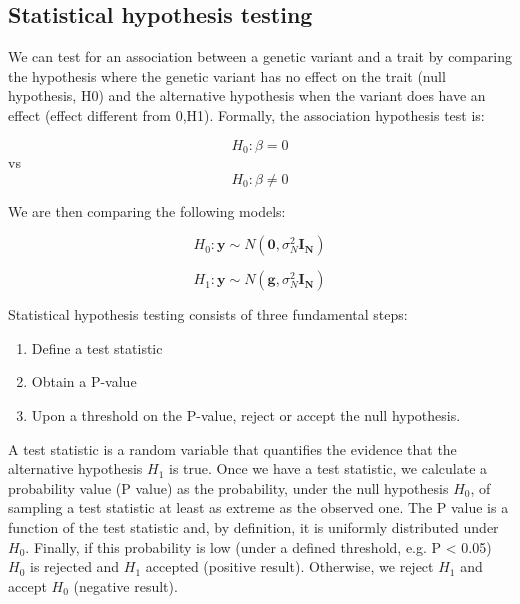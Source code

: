 
\newpage

\subsection{Statistical hypothesis testing}

We can test for an association between a genetic variant and a trait by comparing the hypothesis where the genetic variant has no effect on the trait (null hypothesis, H0) and the alternative hypothesis when the variant does have an effect (effect different from 0,H1).
Formally, the association hypothesis test is:

\begin{equation}\label{eq14:null_hypothesis}
 H_{0}: \beta=0 
\end{equation}
vs
\begin{equation}\label{eq15:alternative_hypothesis}
 H_{0}: \beta \neq 0 
\end{equation}

We are then comparing the following models:

\begin{equation}\label{eq16:null_hypothesis_regression}
 H_0: \mathbf{y} \sim N(\mathbf{0}, \sigma_N^{2} \mathbf{I_N}) 
\end{equation}

\begin{equation}\label{eq17:alternative_hypothesis_regression}
 H_1: \mathbf{y} \sim N(\mathbf{g},\sigma_N^{2} \mathbf{I_N}) 
\end{equation}

Statistical hypothesis testing consists of three fundamental steps:
\begin{enumerate}
  \item Define a test statistic
  \item Obtain a P-value
  \item Upon a threshold on the P-value, reject or accept the null hypothesis. 
\end{enumerate}

A test statistic is a random variable that quantifies the evidence that the alternative hypothesis $H_1$ is true. 
Once we have a test statistic, we calculate a probability value (P value) as the probability, under the null hypothesis $H_0$, of sampling a test statistic at least as extreme as the observed one. 
The P value is a function of the test statistic and, by definition, it is uniformly distributed under $H_0$.
Finally, if this probability is low (under a defined threshold, e.g. P < 0.05) $H_0$ is rejected and $H_1$ accepted (positive result).
Otherwise, we reject $H_1$ and accept $H_0$ (negative result).\\

